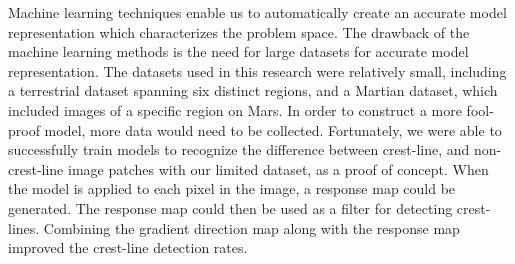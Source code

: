 Machine learning techniques enable us to automatically create an accurate model representation which characterizes the problem space. The drawback of the machine learning methods is the need for large datasets for accurate model representation. The datasets used in this research were relatively small, including a terrestrial dataset spanning six distinct regions, and a Martian dataset, which included images of a specific region on Mars. In order to construct a more fool-proof model, more data would need to be collected. Fortunately, we were able to successfully train models to recognize the difference between crest-line, and non-crest-line image patches with our limited dataset, as a proof of concept. When the model is applied to each pixel in the image, a response map could be generated. The response map could then be used as a filter for detecting crest-lines. Combining the gradient direction map along with the response map improved the crest-line detection rates.

